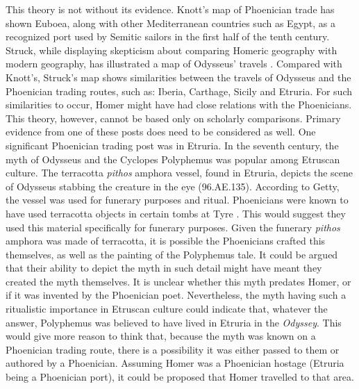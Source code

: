 This theory is not without its evidence. Knott’s map of Phoenician trade has shown Euboea, along with other Mediterranean countries such as Egypt, as a recognized port used by Semitic sailors in the first half of the tenth century\BC \parencite{Knott2014}. Struck, while displaying skepticism about comparing Homeric geography with modern geography, has illustrated a map of Odysseus’ travels \parencite{Struck2009}. Compared with Knott’s, Struck’s map shows similarities between the travels of Odysseus and the Phoenician trading routes, such as: Iberia, Carthage, Sicily and Etruria. For such similarities to occur, Homer might have had close relations with the Phoenicians.  This theory, however, cannot be based only on scholarly comparisons. Primary evidence from one of these posts does need to be considered as well. One significant Phoenician trading post was in Etruria. In the seventh century\BC, the myth of Odysseus and the Cyclopes Polyphemus was popular among Etruscan culture. The terracotta \emph{pithos} amphora vessel, found in Etruria, depicts the scene of Odysseus stabbing the creature in the eye (96.AE.135). According to Getty, the vessel was used for funerary purposes and ritual. Phoenicians were known to have used terracotta objects in certain tombs at Tyre \parencite[152]{Aubet2010}. This would suggest they used this material specifically for funerary purposes. Given the funerary \emph{pithos} amphora was made of terracotta, it is possible the Phoenicians crafted this themselves, as well as the painting of the Polyphemus tale. It could be argued that their ability to depict the myth in such detail might have meant they created the myth themselves. It is unclear whether this myth predates Homer, or if it was invented by the Phoenician poet. Nevertheless, the myth having such a ritualistic importance in Etruscan culture could indicate that, whatever the answer, Polyphemus was believed to have lived in Etruria in the \emph{Odyssey}. This would give more reason to think that, because the myth was known on a Phoenician trading route, there is a possibility it was either passed to them or authored by a Phoenician. Assuming Homer was a Phoenician hostage (Etruria being a Phoenician port), it could be proposed that Homer travelled to that area.
	

